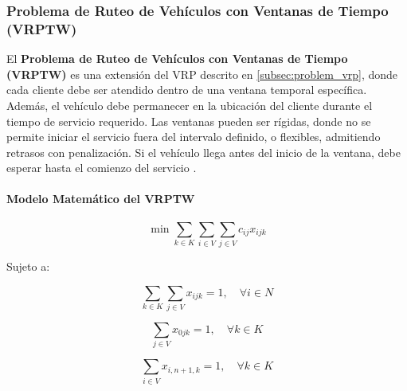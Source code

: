 \documentclass[12pt,titlepage,twoside,openright]{book}
\begin{document}
\subsubsection{Problema de Ruteo de Vehículos con Ventanas de Tiempo (VRPTW)}

El \textbf{Problema de Ruteo de Vehículos con Ventanas de Tiempo (VRPTW)} es una extensión del VRP descrito en \autoref{subsec:problem_vrp}, donde cada cliente debe ser atendido dentro de una ventana temporal específica. Además, el vehículo debe permanecer en la ubicación del cliente durante el tiempo de servicio requerido. Las ventanas pueden ser rígidas, donde no se permite iniciar el servicio fuera del intervalo definido, o flexibles, admitiendo retrasos con penalización. Si el vehículo llega antes del inicio de la ventana, debe esperar hasta el comienzo del servicio \citep{toth2014}.

\paragraph{Modelo Matemático del VRPTW}

\begin{equation}
    \min \sum_{k \in K} \sum_{i \in V} \sum_{j \in V} c_{ij} x_{ijk}
    \label{eq:VRPTW_obj}
\end{equation}

Sujeto a:

\begin{equation}
    \sum_{k \in K} \sum_{j \in V} x_{ijk} = 1, \quad \forall i \in N
    \label{eq:VRPTW_visit_once}
\end{equation}

\begin{equation}
    \sum_{j \in V} x_{0jk} = 1, \quad \forall k \in K
    \label{eq:VRPTW_start_depot}
\end{equation}

\begin{equation}
    \sum_{i \in V} x_{i,n+1,k} = 1, \quad \forall k \in K
    \label{eq:VRPTW_end_depot}
\end{equation}
\end{document}
